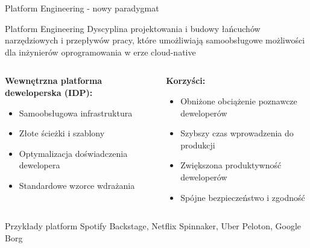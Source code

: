 \documentclass[10pt, aspectratio=169]{beamer}
\begin{document}
\begin{frame}{Platform Engineering - nowy paradygmat}
\begin{alertblock}{Platform Engineering}
Dyscyplina projektowania i budowy łańcuchów narzędziowych i przepływów pracy, które umożliwiają samoobsługowe możliwości dla inżynierów oprogramowania w erze cloud-native
\end{alertblock}

\begin{columns}[T]
\begin{column}{0.5\textwidth}
\textbf{Wewnętrzna platforma deweloperska (IDP):}
\begin{itemize}
\item Samoobsługowa infrastruktura
\item Złote ścieżki i szablony
\item Optymalizacja doświadczenia dewelopera
\item Standardowe wzorce wdrażania
\end{itemize}
\end{column}
\begin{column}{0.5\textwidth}
\textbf{Korzyści:}
\begin{itemize}
\item Obniżone obciążenie poznawcze deweloperów
\item Szybszy czas wprowadzenia do produkcji
\item Zwiększona produktywność deweloperów
\item Spójne bezpieczeństwo i zgodność
\end{itemize}
\end{column}
\end{columns}

\begin{exampleblock}{Przykłady platform}
Spotify Backstage, Netflix Spinnaker, Uber Peloton, Google Borg
\end{exampleblock}
\end{frame}
\end{document}
